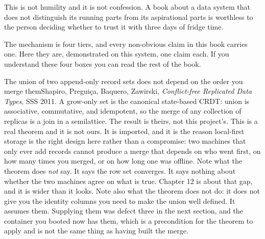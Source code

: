 This is not humility and it is not confession. A book about a data system that does not distinguish its running parts from its aspirational parts is worthless to the person deciding whether to trust it with three days of fridge time.

The mechanism is four tiers, and every non-obvious claim in this book carries one. Here they are, demonstrated on this system, one claim each. If you understand these four boxes you can read the rest of the book.

\begin{Theorem}{The union of two append-only record sets does not depend on the order you merge them}{Shapiro, Pregui\c{c}a, Baquero, Zawirski, \textit{Conflict-free Replicated Data Types}, SSS 2011.}
A grow-only set is the canonical state-based CRDT: union is associative, commutative, and idempotent, so the merge of any collection of replicas is a join in a semilattice. The result is theirs, not this project's.
This is a real theorem and it is not ours. It is imported, and it is the reason local-first storage is the right design here rather than a compromise: two machines that only ever add records cannot produce a merge that depends on who went first, on how many times you merged, or on how long one was offline. Note what the theorem does \emph{not} say. It says the row set converges. It says nothing about whether the two machines agree on what is true. Chapter 12 is about that gap, and it is wider than it looks. Note also what the theorem does not do: it does not give you the identity columns you need to make the union well defined. It assumes them. Supplying them was defect three in the next section, and the container you booted now has them, which is a precondition for the theorem to apply and is not the same thing as having built the merge.
\end{Theorem}

